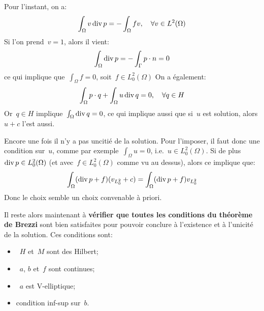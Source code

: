 \medskip
Pour l'instant, on a:
\begin{equation}\displaystyle\int_\Omega v \operatorname{div} p = -\displaystyle\int_\Omega fv,\quad\forall v\in L^2(\Omega)\end{equation}
Si l'on prend~$v=1$, alors il vient:
\begin{equation}\displaystyle\int_\Omega \operatorname{div} p = -\displaystyle\int_\Gamma p\cdot n =0
\end{equation}
ce qui
implique que~$\int_\Omega f=0$, soit~$f\in L^2_0(\Omega)$
\medskip
On a également:
\begin{equation}\int_\Omega p\cdot q + \displaystyle\int_\Omega u \operatorname{div} q =0,\quad\forall q\in H\end{equation}
Or~$q\in H$ implique~$\int_\Omega \operatorname{div} q =0$, ce qui implique aussi que si~$u$ est solution, alors
$u+c$ l'est aussi.

Encore une fois il n'y a pas uncitié de la solution. Pour l'imposer, il faut donc une condition sur~$u$, comme
par exemple~$\int_\Omega u=0$, i.e.~$u\in L^2_0(\Omega)$.
Si de plus~$\operatorname{div} p\in L^2_0(\Omega)$ (et avec~$f\in L^2_0(\Omega)$ comme vu au dessus), alors ce
implique que:
\begin{equation}\displaystyle\int_\Omega (\operatorname{div} p + f)(v_{L^2_0}+c) = \displaystyle\int_\Omega (\operatorname{div} p+f) v_{L^2_0}\end{equation}
\medskip
Donc le choix  semble un choix convenable à priori.

\medskip
Il reste alors maintenant à \textbf{vérifier que toutes les conditions du théorème de Brezzi}
sont bien satisfaites pour pouvoir conclure à l'existence et à l'unicité de la solution.
Ces conditions sont:
\begin{itemize}
  \item~$H$ et~$M$ sont des Hilbert;
  \item~$a$, $b$ et~$f$ sont continues;
  \item~$a$ est V-elliptique;
  \item condition inf-sup sur~$b$.
\end{itemize}

